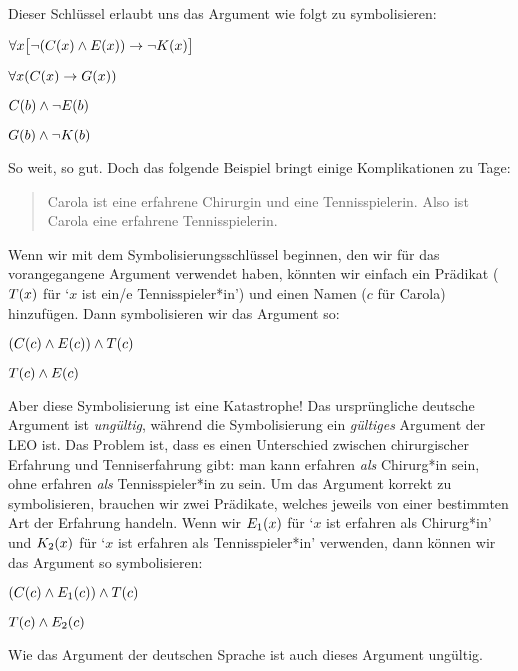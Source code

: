 Dieser Schlüssel erlaubt uns das Argument wie folgt zu symbolisieren:
\begin{earg}
\label{surgeon2}
\item[] $\forall x\bigl[\neg (\mathord{C}(x) \wedge \mathord{E}(x)) \rightarrow \neg \mathord{K}(x)\bigr]$
\item[] $\forall x(\mathord{C}(x) \rightarrow \mathord{G}(x))$
\item[] $\mathord{C}(b) \wedge \neg \mathord{E}(b)$
\item[\therefore] $\mathord{G}(b) \wedge \neg \mathord{K}(b)$
\end{earg}

So weit, so gut. Doch das folgende Beispiel bringt einige Komplikationen zu Tage:
\begin{quote}
\label{surgeon3}
Carola ist eine erfahrene Chirurgin und eine Tennisspielerin. Also ist Carola eine erfahrene Tennisspielerin.
\end{quote}
Wenn wir mit dem Symbolisierungsschlüssel beginnen, den wir für das vorangegangene Argument verwendet haben, könnten wir einfach ein Prädikat ($\mathord{T}(x)$ für `$x$ ist ein/e Tennisspieler*in') und einen Namen ($c$ für Carola) hinzufügen. Dann symbolisieren wir das Argument so:
\begin{earg}
\item[] $(\mathord{C}(c) \wedge \mathord{E}(c)) \wedge \mathord{T}(c)$
\item[\therefore] $\mathord{T}(c) \wedge \mathord{E}(c)$
\end{earg}
Aber diese Symbolisierung ist eine Katastrophe! Das ursprüngliche deutsche Argument ist \emph{ungültig}, während die Symbolisierung ein \emph{gültiges} Argument der LEO ist. Das Problem ist, dass es einen Unterschied zwischen chirurgischer Erfahrung und Tenniserfahrung gibt: man kann erfahren \emph{als} Chirurg*in sein, ohne erfahren \emph{als} Tennisspieler*in zu sein. Um das Argument korrekt zu symbolisieren, brauchen wir zwei Prädikate, welches jeweils von einer bestimmten Art der Erfahrung handeln. Wenn wir $\mathord{E_1}(x)$ für `$x$ ist erfahren als Chirurg*in' und $\mathord{K_2}(x)$ für `$x$ ist erfahren als Tennisspieler*in' verwenden, dann können wir das Argument so symbolisieren:
\begin{earg}
\label{surgeon3correct}
\item[] $(\mathord{C}(c) \wedge \mathord{E_1}(c)) \wedge \mathord{T}(c)$
\item[\therefore] $\mathord{T}(c) \wedge \mathord{E_2}(c)$
\end{earg}
Wie das Argument der deutschen Sprache ist auch dieses Argument ungültig.


